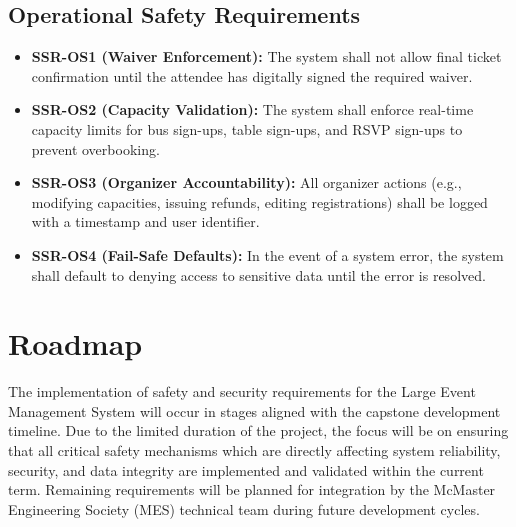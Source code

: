 \documentclass{article}
\begin{document}
\subsection{Operational Safety Requirements}
\begin{itemize}
    \item \textbf{SSR-OS1 (Waiver Enforcement):} The system shall not allow final ticket confirmation until the attendee has digitally signed the required waiver.
    \item \textbf{SSR-OS2 (Capacity Validation):} The system shall enforce real-time capacity limits for bus sign-ups, table sign-ups, and RSVP sign-ups to prevent overbooking.
    \item \textbf{SSR-OS3 (Organizer Accountability):} All organizer actions (e.g., modifying capacities, issuing refunds, editing registrations) shall be logged with a timestamp and user identifier.
    \item \textbf{SSR-OS4 (Fail-Safe Defaults):} In the event of a system error, the system shall default to denying access to sensitive data until the error is resolved.
\end{itemize}


\section{Roadmap}

The implementation of safety and security requirements for the Large Event Management System will occur in stages aligned with the capstone development timeline. Due to the limited duration of the project, the focus will be on ensuring that all critical safety mechanisms which are directly affecting system reliability, security, and data integrity are implemented and validated within the current term. Remaining requirements will be planned for integration by the McMaster Engineering Society (MES) technical team during future development cycles.
\end{document}
